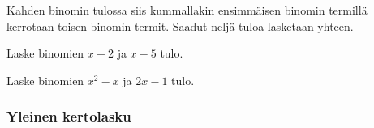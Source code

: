 Kahden binomin tulossa siis kummallakin ensimmäisen binomin termillä kerrotaan toisen binomin termit. Saadut neljä tuloa lasketaan yhteen. 

\newcommand{\pbezier}[4]{
	\pgfmathsetmacro{\PBxa}{#1}
	\pgfmathsetmacro{\PBxb}{#2}
	\pgfmathsetmacro{\PBya}{#3}
	\pgfmathsetmacro{\PByb}{#3+#4}
	\pgfmathsetmacro{\PBca}{0.8 * \PBxa + 0.2 * \PBxb}
	\pgfmathsetmacro{\PBcb}{0.2 * \PBxa + 0.8 * \PBxb}
	\draw[color=red] (\PBxa, \PBya) .. controls (\PBca, \PByb) and (\PBcb, \PByb) .. (\PBxb, \PBya);
}

\begin{esimerkki}
Laske binomien $x+2$ ja $x-5$ tulo. \\
\newline
\end{esimerkki}

\begin{esimerkki}
Laske binomien $x^2-x$ ja $2x-1$ tulo. \\
\newline
\end{esimerkki}




\subsubsection*{Yleinen kertolasku}

